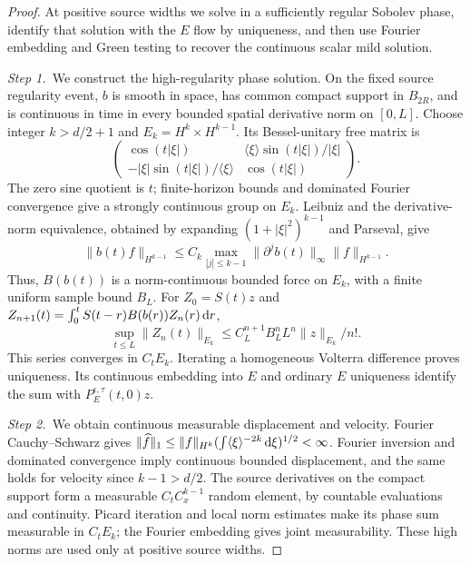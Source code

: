 \begin{proof}
  At positive source widths we solve in a sufficiently regular Sobolev phase,
  identify that solution with the $E$ flow by uniqueness, and then use Fourier
  embedding and Green testing to recover the continuous scalar mild solution.


  \medskip
  \noindent\textit{Step 1.~}We construct the high-regularity phase solution.
  On the fixed source regularity event, $b$ is smooth in space, has common
  compact support in $B_{2R}$, and is continuous in time in every bounded
  spatial derivative norm on $[0,L]$. Choose integer $k > d/2+1$ and $E_k =
  H^k\times H^{k-1}$. Its Bessel-unitary free matrix is
  \[
    \begin{pmatrix}
      \cos(t|\xi|)&\langle\xi\rangle\sin(t|\xi|)/|\xi|\\
      -|\xi|\sin(t|\xi|)/\langle\xi\rangle&\cos(t|\xi|)
    \end{pmatrix}.
  \]
  The zero sine quotient is $t$; finite-horizon bounds and dominated Fourier
  convergence give a strongly continuous group on $E_k$. Leibniz and the
  derivative-norm equivalence, obtained by expanding $(1+|\xi|^2)^{k-1}$ and
  Parseval, give
  \[
    \|b(t)f\|_{H^{k-1}}
    \le C_k\max_{|j|\le k-1}\|\partial^jb(t)\|_\infty
    \|f\|_{H^{k-1}} .
  \]
  Thus, $B(b(t))$ is a norm-continuous bounded force on $E_k$, with a finite
  uniform sample bound $B_L$. For $Z_0 = S(t)z$ and $Z_{n+1}(t) =
  \int_0^tS(t-r)B(b(r))Z_n(r)\,\mathrm{d} r$,
  \[
    \sup_{t\le L}\|Z_n(t)\|_{E_k}
    \le C_L^{n+1}B_L^nL^n\|z\|_{E_k}/n! .
  \]
  This series converges in $C_tE_k$. Iterating a homogeneous Volterra difference
  proves uniqueness. Its continuous embedding into $E$ and ordinary $E$
  uniqueness identify the sum with $P_E^{\epsilon,\tau}(t,0)z$.


  \medskip
  \noindent\textit{Step 2.~}We obtain continuous measurable displacement and
  velocity.
  Fourier Cauchy--Schwarz gives $\|\widehat{f}\|_1 \le \|f\|_{H^k}
  (\int\langle\xi\rangle^{-2k}\,\mathrm{d}\xi)^{1/2} < \infty$. Fourier inversion and
  dominated convergence imply continuous bounded displacement, and the same
  holds for velocity since $k-1 > d/2$. The source derivatives on the compact
  support form a measurable $C_tC_x^{k-1}$ random element, by countable
  evaluations and continuity. Picard iteration and local norm estimates make its
  phase sum measurable in $C_tE_k$; the Fourier embedding gives joint
  measurability. These high norms are used only at positive source widths.



\end{proof}
